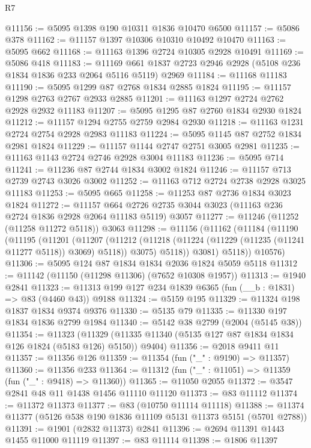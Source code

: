 \begin{lexlean}{R7}
\begin{coremodule}
@11156 := @5095 @1398 @190 @10311 @1836 @10470 @6500
@11157 := @5086 @378
@11162 := @11157 @1397 @10306 @10310 @10492 @10470
@11163 := @5095 @662
@11168 := @11163 @1396 @2724 @10305 @2928 @10491
@11169 := @5086 @418
@11183 := @11169 @661 @1837 @2723 @2946 @2928 (@5108 @236 @1834 @1836 @233 @2064 @5116 @5119) @2969
@11184 := @11168 @11183
@11190 := @5095 @1299 @87 @2768 @1834 @2885 @1824
@11195 := @11157 @1298 @2763 @2767 @2933 @2885
@11201 := @11163 @1297 @2724 @2762 @2928 @2932 @11183
@11207 := @5095 @1295 @87 @2760 @1834 @2930 @1824
@11212 := @11157 @1294 @2755 @2759 @2984 @2930
@11218 := @11163 @1231 @2724 @2754 @2928 @2983 @11183
@11224 := @5095 @1145 @87 @2752 @1834 @2981 @1824
@11229 := @11157 @1144 @2747 @2751 @3005 @2981
@11235 := @11163 @1143 @2724 @2746 @2928 @3004 @11183
@11236 := @5095 @714
@11241 := @11236 @87 @2744 @1834 @3002 @1824
@11246 := @11157 @713 @2739 @2743 @3026 @3002
@11252 := @11163 @712 @2724 @2738 @2928 @3025 @11183
@11253 := @5095 @665
@11258 := @11253 @87 @2736 @1834 @3023 @1824
@11272 := @11157
    @664
    @2726
    @2735
    @3044
    @3023
    (@11163 @236 @2724 @1836 @2928 @2064 @11183 @5119)
    @3057
@11277 := @11246 (@11252 (@11258 @11272 @5118)) @3063
@11298 := @11156
    (@11162
      (@11184
        (@11190
          (@11195
            (@11201
              (@11207
                (@11212 (@11218 (@11224 (@11229 (@11235 (@11241 @11277 @5118)) @3069) @5118)) @3075)
                @5118))
            @3081)
          @5118))
      @10576)
@11306 := @5095 @124 @87 @1834 @1834 @2036 @1824 @5059 @5118
@11312 := @11142 (@11150 (@11298 @11306) (@7652 @10308 @1957))
@11313 := @1940 @2841
@11323 := @11313 @199 @127 @234 @1839 @6365 (fun (__b : @1831) => @83 (@4460 @43)) @9188
@11324 := @5159 @195
@11329 := @11324 @198 @1837 @1834 @9374 @9376
@11330 := @5135 @79
@11335 := @11330 @197 @1834 @1836 @2799 @1984
@11340 := @5142 @38 @2799 (@2004 (@5145 @38))
@11354 := @11323
    (@11329 (@11335 @11340 (@5135 @127 @87 @1834 @1834 @126 @1824 (@5183 @126) @5150)) @9404)
@11356 := @2018 @9411 @11
@11357 := @11356 @126
@11359 := @11354 (fun ("_" : @9190) => @11357)
@11360 := @11356 @233
@11364 := @11312 (fun ("_" : @11051) => @11359 (fun ("_" : @9418) => @11360))
@11365 := @11050 @2055
@11372 := @3547 @2841 @48 @11 @1438 @1456 @11110 @11120
@11373 := @83 @11112
@11374 := @11372 @11373
@11377 := @83 (@10750 @11114 @11118)
@11388 := @11374 @11377 (@5126 @538 @190 @1836 @11109 @5131 @11373 @5151 (@5701 @2788))
@11391 := @1901 (@2832 @11373) @2841
@11396 := @2694 @11391 @1443 @1455 @11000 @11119
@11397 := @83 @11114
@11398 := @1806 @11397

\end{coremodule}
\end{lexlean}
